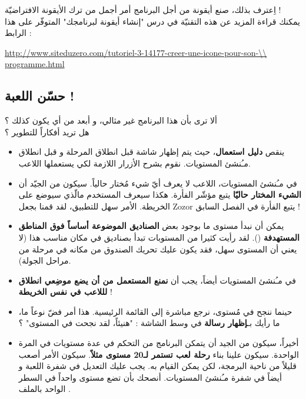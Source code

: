 
اِعترف بذلك، صنع أيقونة من أجل البرنامج أمر أجمل من ترك الأيقونة الافتراضيّة !\\
يمكنك قراءة المزيد عن هذه التقنيّة في درس "إنشاء أيقونة لبرنامجك" المتوفّر على هذا الرابط :

\url{http://www.siteduzero.com/tutoriel-3-14177-creer-une-icone-pour-son-\\
programme.html}

\subsection{حسّن اللعبة !}

ألا ترى بأن هذا البرنامج غير مثالي، و أبعد من أي يكون كذلك ؟\\
هل تريد أفكاراً للتطوير ؟

\begin{itemize}
	\item ينقص
	\textbf{دليل استعمال}،
	حيث يتم إظهار شاشة قبل انطلاق المرحلة و قبل انطلاق مـُنشئ المستويات. نقوم بشرح الأزرار اللازمة لكي يستعملها اللاعب.
	\item في مـُنشئ المستويات، اللاعب لا يعرف أيّ شيء مُختار حالياً. سيكون من الجيّد أن 
	\textbf{الشيء المختار حاليّا}
	يتبع مؤشّر الفأرة. هكذا سيعرف المستخدم مالّذي سيوضع على الخريطة. الأمر سهل للتطبيق، لقد قمنا بجعل
	\textenglish{Zozor}
	يتبع الفأرة في الفصل السابق !
	\item يمكن أن نبدأ مستوى ما بوجود بعض
	\textbf{الصناديق الموضوعة أساساً فوق المناطق المستهدفة}
	().
	لقد رأيت كثيرا من المستوبات تبدأ بصناديق في مكان مناسب هذا (لا يعني أن المستوى سهل، فقد يكون عليك تحريك الصندوق من مكانه في مرحلة من مراحل الجولة).
	\item في مـُنشئ المستويات أيضاً، يجب أن
	\textbf{نمنع المستعمل من أن يضع موضِعي انطلاق لللاعب في نفس الخريطة} !
	\item حينما ننجح في مُستوى، نرجع مباشرة إلى القائمة الرئيسية. هذا أمر فضّ نوعاً ما، ما رأيك بـ\textbf{إظهار رسالة}
	في وسط الشاشة : "هنيئاً، لقد نجحت في المستوى" ؟
	\item أخيراً، سيكون من الجيد أن يتمكن البرنامج من التحكم في عدة مستويات في المرة الواحدة. سيكون علينا بناء
	\textbf{رحلة لعب تستمر لـ20 مستوى مثلاً}.
	سيكون الأمر أصعب قليلاً من ناحية البرمجة، لكن يمكن القيام به. يجب عليك التعديل في شفرة اللعبة و أيضاً في شفرة مـُنشئ المستويات. أنصحك بأن تضع مستوى واحداً في السطر الواحد بالملف
	.
\end{itemize}

